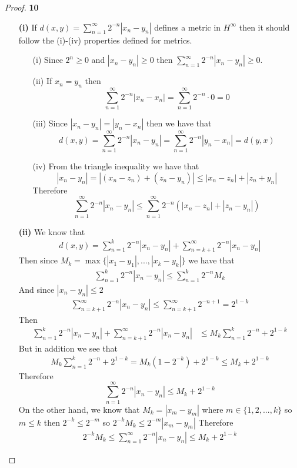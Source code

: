 \documentclass[11pt]{article}
\theoremstyle{definition}
\begin{document}
	\begin{proof}{\textbf{10}}
        \begin{itemize}
        \item [\bf{(i)}]
        If $d(x,y) = \sum_{n=1}^\infty 2^{-n}|x_n - y_n|$ defines a metric in $H^{\infty}$
        then it should follow the (i)-(iv) properties defined for metrics.
        \begin{itemize}
            \item [(i)] Since $2^n \geq 0$ and $|x_n - y_n| \geq 0$ then
            $\sum_{n=1}^\infty 2^{-n}|x_n - y_n| \geq 0$.
            \item [(ii)] If $x_n = y_n$ then
            $$\sum_{n=1}^\infty 2^{-n}|x_n - x_n| = \sum_{n=1}^\infty 2^{-n} \cdot 0 = 0$$
            \item [(iii)] Since $|x_n - y_n| = |y_n - x_n|$ then we have that 
            $$d(x,y) = \sum_{n=1}^\infty 2^{-n}|x_n - y_n| =
            \sum_{n=1}^\infty 2^{-n}|y_n - x_n| = d(y,x)$$
            \item [(iv)] From the triangle inequality we have that
            $$|x_n - y_n| = |(x_n - z_n) + (z_n - y_n)| \leq |x_n - z_n| + |z_n + y_n|$$
            Therefore
            $$\sum_{n=1}^\infty 2^{-n}|x_n - y_n| \leq
            \sum_{n=1}^\infty 2^{-n}(|x_n - z_n| + |z_n - y_n|)$$
        \end{itemize}
\cleardoublepage
        \item [\bf{(ii)}]
        We know that 
        \begin{align*}
            d(x,y) = \sum_{n=1}^k 2^{-n}|x_n - y_n| + \sum_{n=k+1}^\infty 2^{-n}|x_n - y_n|
        \end{align*}
        Then since $M_k = \max\{|x_1 - y_1|, ..., |x_k - y_k|\}$
        we have that
        \begin{align*}
            \sum_{n=1}^k 2^{-n}|x_n - y_n| \leq \sum_{n=1}^k 2^{-n}M_k
        \end{align*}
        And since $|x_n - y_n| \leq 2$ 
        \begin{align*}
            \sum_{n=k+1}^\infty 2^{-n}|x_n - y_n| \leq \sum_{n=k+1}^\infty 2^{-n+1} = 2^{1-k}
        \end{align*}
        Then
        \begin{align*}
            \sum_{n=1}^k 2^{-n}|x_n - y_n| + \sum_{n=k+1}^\infty 2^{-n}|x_n - y_n|
            &\leq M_k\sum_{n=1}^k 2^{-n} + 2^{1-k}
        \end{align*}
        But in addition we see that
        \begin{align*}
            M_k\sum_{n=1}^k 2^{-n} + 2^{1-k} = M_k(1 - 2^{-k})+ 2^{1-k} \leq M_k + 2^{1-k}
        \end{align*}
        Therefore
        $$\sum_{n=1}^\infty 2^{-n}|x_n - y_n| \leq M_k + 2^{1-k}$$
        On the other hand, we know that $M_k = |x_m - y_m|$ where $m \in \{1,2,...,k\}$
        so $m \leq k$ then $2^{-k} \leq 2^{-m}$ so $2^{-k}M_k \leq 2^{-m}|x_m - y_m|$
        Therefore
        \begin{align*}
            2^{-k}M_k \leq \sum_{n=1}^\infty 2^{-n}|x_n - y_n| \leq M_k + 2^{1-k}
        \end{align*}
        

\end{itemize}
\end{proof}
\end{document}

